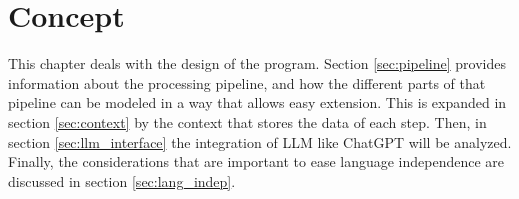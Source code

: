 \begingroup
\renewcommand{\cleardoublepage}{} %
\renewcommand{\clearpage}{}
\chapter{Concept}\label{chapter:conception}
\endgroup
This chapter deals with the design of the program. Section \ref{sec:pipeline}  provides information about the processing pipeline, and how the different parts of that pipeline can be modeled in a way that allows easy extension. This is expanded in section \ref{sec:context} by the context that stores the data of each step. Then, in section \ref{sec:llm_interface} the integration of \ac{LLM} like ChatGPT will be analyzed. Finally, the considerations that are important to ease language independence are discussed in section \ref{sec:lang_indep}.

\hfill\hfill






